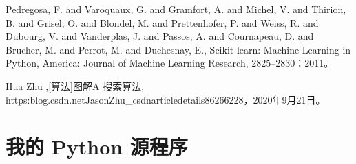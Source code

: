 \documentclass[bwprint]{gmcmthesis}
\begin{document}
\newpage
\begin{thebibliography}{99}  
Pedregosa, F. and Varoquaux, G. and Gramfort, A. and Michel, V.
         and Thirion, B. and Grisel, O. and Blondel, M. and Prettenhofer, P.
         and Weiss, R. and Dubourg, V. and Vanderplas, J. and Passos, A. and
         Cournapeau, D. and Brucher, M. and Perrot, M. and Duchesnay, E., Scikit-learn: Machine Learning in {P}ython, America: Journal of Machine Learning Research, 2825--2830：2011。


 Hua Zhu ,[算法]图解A\* 搜索算法, https:\/\/blog.csdn.net\/JasonZhu\_csdn\/article\/details\/86266228，2020年9月21日。

 \end{thebibliography}




% 
% 









\newpage
\appendix
\section{我的 Python 源程序}
\begin{lstlisting}[language=Python]%设置不同语言即可。



 \end{lstlisting}
\end{document}
